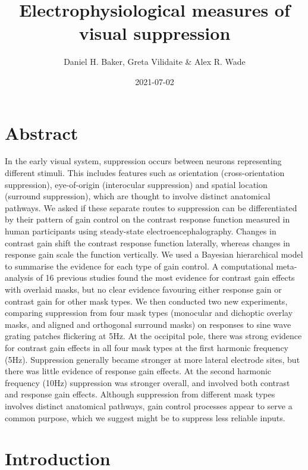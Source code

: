 \documentclass[]{article}
\title{Electrophysiological measures of visual suppression}
\author{Daniel H. Baker, Greta Vilidaite \& Alex R. Wade}
\date{2021-07-02}
\begin{document}
\maketitle


\hypertarget{abstract}{%
\section{Abstract}\label{abstract}}

In the early visual system, suppression occurs between neurons representing different stimuli. This includes features such as orientation (cross-orientation suppression), eye-of-origin (interocular suppression) and spatial location (surround suppression), which are thought to involve distinct anatomical pathways. We asked if these separate routes to suppression can be differentiated by their pattern of gain control on the contrast response function measured in human participants using steady-state electroencephalography. Changes in contrast gain shift the contrast response function laterally, whereas changes in response gain scale the function vertically. We used a Bayesian hierarchical model to summarise the evidence for each type of gain control. A computational meta-analysis of 16 previous studies found the most evidence for contrast gain effects with overlaid masks, but no clear evidence favouring either response gain or contrast gain for other mask types. We then conducted two new experiments, comparing suppression from four mask types (monocular and dichoptic overlay masks, and aligned and orthogonal surround masks) on responses to sine wave grating patches flickering at 5Hz. At the occipital pole, there was strong evidence for contrast gain effects in all four mask types at the first harmonic frequency (5Hz). Suppression generally became stronger at more lateral electrode sites, but there was little evidence of response gain effects. At the second harmonic frequency (10Hz) suppression was stronger overall, and involved both contrast and response gain effects. Although suppression from different mask types involves distinct anatomical pathways, gain control processes appear to serve a common purpose, which we suggest might be to suppress less reliable inputs.

\hypertarget{introduction}{%
\section{Introduction}\label{introduction}}
\end{document}
